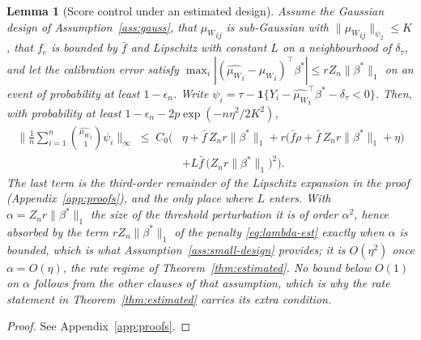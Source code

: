 \documentclass[12pt,a4paper]{article}
\newtheorem{lemma}[theorem]{Lemma}
\theoremstyle{definition}
\theoremstyle{remark}
\newcommand{\ind}[1]{\mathbf{1}\{#1\}}
\newcommand{\betas}{\beta^*}
\newcommand{\muv}{\mu_W}
\begin{document}
\begin{lemma}[Score control under an estimated design]
\label{lem:score-control}
Assume the Gaussian design of Assumption~\ref{ass:gauss}, that ${\muv}_{ij}$ is sub-Gaussian
with $\|{\muv}_{ij}\|_{\psi_2}\le K$, that $f_e$ is bounded by $\bar f$ and Lipschitz with
constant $L$ on a neighbourhood of $\delta_\tau$, and let the calibration error satisfy
$\max_i|({\hat{\muv}}_i-{\muv}_i)^\top\betas|\le rZ_n\|\betas\|_1$ on an event of probability at
least $1-\epsilon_n$. Write
$\psi_i=\tau-\ind{Y_i-{\hat{\muv}}_i^\top\betas-\delta_\tau<0}$. Then, with probability at
least $1-\epsilon_n-2p\exp(-n\eta^2/2K^2)$,
\begin{equation}
\begin{split}
\Big\|\frac1n\sum_{i=1}^n\binom{{\hat{\muv}}_i}{1}\psi_i\Big\|_\infty
\;\le\; C_0\Big(&\eta + \bar f\,Z_nr\|\betas\|_1
+ r\big(\bar f\rho + \bar f\,Z_nr\|\betas\|_1 + \eta\big)\\
&+ L\bar f\,\big(Z_nr\|\betas\|_1\big)^2\Big).
\end{split}
\label{eq:score-control}
\end{equation}
The last term is the third-order remainder of the Lipschitz expansion in the proof
(Appendix~\ref{app:proofs}), and the only place where $L$ enters. With
$\alpha=Z_nr\|\betas\|_1$ the size of
the threshold perturbation it is of order $\alpha^2$, hence absorbed by the term
$rZ_n\|\betas\|_1$ of the penalty \eqref{eq:lambda-est} exactly when $\alpha$ is bounded,
which is what Assumption~\ref{ass:small-design} provides; it is $O(\eta^2)$ once
$\alpha=O(\eta)$, the rate regime of Theorem~\ref{thm:estimated}. No bound below
$O(1)$ on $\alpha$ follows from the other clauses of that assumption, which is why the
rate statement in Theorem~\ref{thm:estimated} carries its extra condition.
\end{lemma}

\begin{proof}
See Appendix~\ref{app:proofs}.
\end{proof}
\end{document}
